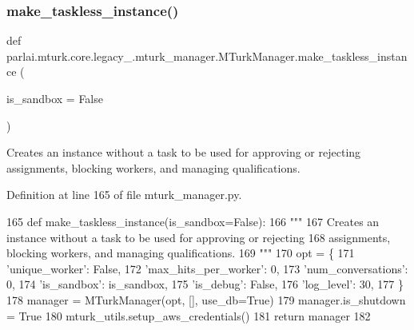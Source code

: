 \subsubsection{\texorpdfstring{make\+\_\+taskless\+\_\+instance()}{make\_taskless\_instance()}}
{\footnotesize\ttfamily def parlai.\+mturk.\+core.\+legacy\+\_.\+mturk\+\_\+manager.\+M\+Turk\+Manager.\+make\+\_\+taskless\+\_\+instance (\begin{DoxyParamCaption}\item[{}]{is\+\_\+sandbox = {\ttfamily False} }\end{DoxyParamCaption})\hspace{0.3cm}{\ttfamily [static]}}

\begin{DoxyVerb}Creates an instance without a task to be used for approving or rejecting
assignments, blocking workers, and managing qualifications.
\end{DoxyVerb}
 

Definition at line 165 of file mturk\+\_\+manager.\+py.


\begin{DoxyCode}
165     \textcolor{keyword}{def }make\_taskless\_instance(is\_sandbox=False):
166         \textcolor{stringliteral}{"""}
167 \textcolor{stringliteral}{        Creates an instance without a task to be used for approving or rejecting}
168 \textcolor{stringliteral}{        assignments, blocking workers, and managing qualifications.}
169 \textcolor{stringliteral}{        """}
170         opt = \{
171             \textcolor{stringliteral}{'unique\_worker'}: \textcolor{keyword}{False},
172             \textcolor{stringliteral}{'max\_hits\_per\_worker'}: 0,
173             \textcolor{stringliteral}{'num\_conversations'}: 0,
174             \textcolor{stringliteral}{'is\_sandbox'}: is\_sandbox,
175             \textcolor{stringliteral}{'is\_debug'}: \textcolor{keyword}{False},
176             \textcolor{stringliteral}{'log\_level'}: 30,
177         \}
178         manager = MTurkManager(opt, [], use\_db=\textcolor{keyword}{True})
179         manager.is\_shutdown = \textcolor{keyword}{True}
180         mturk\_utils.setup\_aws\_credentials()
181         \textcolor{keywordflow}{return} manager
182 
\end{DoxyCode}
\mbox{\label{classparlai_1_1mturk_1_1core_1_1legacy__2018_1_1mturk__manager_1_1MTurkManager_a6d392de0d47014a0433ea7e996900b13}} 
